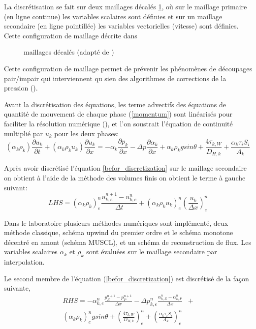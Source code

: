\documentclass[12pt]{article}
\begin{document}
La discrétisation se fait sur deux maillages décalés \ref{staggered_grid}, où sur le maillage primaire (en ligne continue) les variables scalaires sont définies et sur un maillage secondaire (en ligne pointillée) les variables vectorielles (vitesse) sont définies. Cette configuration de maillage décrite dans \cite{Patankar80}

\begin{figure}[htbp]
    \centering
    
    \caption{maillages décalés (adapté de \cite{Ruiz12})}
    \label{staggered_grid}
\end{figure}

Cette configuration de maillage permet de prévenir les phénomènes de découpages pair/impair qui interviennent qu sien des algorithmes de corrections de la pression (\cite{Patankar80}).

Avant la discrétisation des équations, les terme advectifs des équations de quantité de mouvement de chaque phase (\ref{momentum}) sont linéarisés pour faciliter la résolution numérique (\cite{Wang15}), et l'on soustrait l'équation de continuité multiplié par \(u_k\) pour les deux phases:
\begin{equation}
    (\alpha_k \rho_k) \frac{\partial u_k}{\partial t} + ( \alpha_k \rho_k u_k) \frac{\partial u_k}{\partial x} = - \alpha_k \frac{\partial p_k}{\partial x} - \Delta p \frac{\partial \alpha_k}{\partial x} + \alpha_k \rho_k g sin\theta + \frac{4 \tau_{k, W}}{ D_{H, k} } + \frac{\alpha_k \tau_i S_i}{A_k}
    \label{befor_discretization}
\end{equation}

Après avoir discrétisé l'équation \ref{befor_discretization} sur le maillage secondaire on obtient à l'aide de la méthode des volumes finis on obtient le terme à gauche suivant:
\begin{equation}
    LHS = (\alpha_k \rho_k)_e^n \frac{u_{k,e}^{n+1} - u_{k, e}^{n} }{\Delta t} + (\alpha_k \rho_k u_k)_e^n \left( \frac{u_k}{\Delta x} \right)_e^n
    \label{LHS}
\end{equation}

Dans le laboratoire plusieurs méthodes numériques sont implémenté, deux méthode classique, schéma upwind du premier ordre et le schéma monotone décentré en amont (schéma MUSCL), et un schéma de reconstruction de flux. Les variables scalaires \(\alpha_k\) et \(\rho_k\) sont évaluées sur le maillage secondaire par interpolation.

Le second membre de l'équation (\ref{befor_discretization}) est discrétisé de la façon suivante, 
\begin{equation}
    \begin{split}
        RHS = - \alpha_{k, e}^n \frac{p_E^{n+1} - p_P^{n+1}}{\Delta x} - \Delta p _{k, e}^n \frac{\alpha_{k, E}^n - \alpha_{k, P}^n}{\Delta x} &+ \\
        (\alpha_k \rho_k)_e^ngsin\theta + \left( \frac{4 \tau_{k, W}}{D_{H, k}} \right)_e^n + \left( \frac{\alpha_k \tau_i S_i}{A_k} \right)_e^n
    \end{split}
    \label{RHS}
\end{equation}
\end{document}
